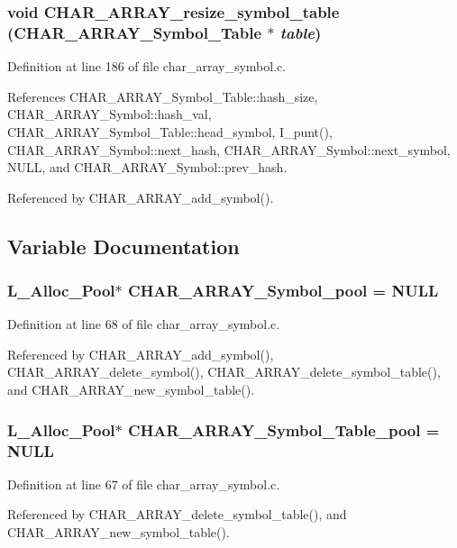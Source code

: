 \subsubsection{\setlength{\rightskip}{0pt plus 5cm}void CHAR\_\-ARRAY\_\-resize\_\-symbol\_\-table (\bf{CHAR\_\-ARRAY\_\-Symbol\_\-Table} $\ast$ {\em table})}\label{char__array__symbol_8c_a82e108e94e034614ccbc8bd3d983e0d}




Definition at line 186 of file char\_\-array\_\-symbol.c.

References CHAR\_\-ARRAY\_\-Symbol\_\-Table::hash\_\-size, CHAR\_\-ARRAY\_\-Symbol::hash\_\-val, CHAR\_\-ARRAY\_\-Symbol\_\-Table::head\_\-symbol, I\_\-punt(), CHAR\_\-ARRAY\_\-Symbol::next\_\-hash, CHAR\_\-ARRAY\_\-Symbol::next\_\-symbol, NULL, and CHAR\_\-ARRAY\_\-Symbol::prev\_\-hash.

Referenced by CHAR\_\-ARRAY\_\-add\_\-symbol().

\subsection{Variable Documentation}
\subsubsection{\setlength{\rightskip}{0pt plus 5cm}\bf{L\_\-Alloc\_\-Pool}$\ast$ \bf{CHAR\_\-ARRAY\_\-Symbol\_\-pool} = NULL}\label{char__array__symbol_8c_50e60edb595076c762b08b6adc3de827}




Definition at line 68 of file char\_\-array\_\-symbol.c.

Referenced by CHAR\_\-ARRAY\_\-add\_\-symbol(), CHAR\_\-ARRAY\_\-delete\_\-symbol(), CHAR\_\-ARRAY\_\-delete\_\-symbol\_\-table(), and CHAR\_\-ARRAY\_\-new\_\-symbol\_\-table().
\subsubsection{\setlength{\rightskip}{0pt plus 5cm}\bf{L\_\-Alloc\_\-Pool}$\ast$ \bf{CHAR\_\-ARRAY\_\-Symbol\_\-Table\_\-pool} = NULL}\label{char__array__symbol_8c_a97438175e305a99515e4018dad2d1d2}




Definition at line 67 of file char\_\-array\_\-symbol.c.

Referenced by CHAR\_\-ARRAY\_\-delete\_\-symbol\_\-table(), and CHAR\_\-ARRAY\_\-new\_\-symbol\_\-table().